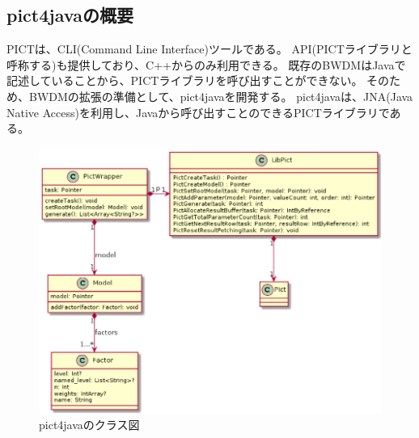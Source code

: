 \documentclass[uplatex, report, a4j, 10pt]{jsbook}
\newcommand\ttt[1]{\texttt{#1}}
\begin{document}
\subsection{pict4javaの概要}\label{sec:create_pict4java}
PICTは、CLI(Command Line Interface)ツールである。
API(PICTライブラリと呼称する)も提供しており、C++からのみ利用できる。
既存のBWDMはJavaで記述していることから、PICTライブラリを呼び出すことができない。
そのため、BWDMの拡張の準備として、pict4javaを開発する。
pict4javaは、JNA(Java Native Access)\cite{jna}を利用し、Javaから呼び出すことのできるPICTライブラリである。

\begin{figure}[tp]
  \centering
  \includegraphics[keepaspectratio, width=160mm]{figs/pict4java_class}
  \caption{pict4javaのクラス図}
  \label{fig:pict4javaClass}
\end{figure}

\newcommand{\PictAddParameter}{\ttt{PictAddParameter}}
\newcommand{\PictGenerate}{\ttt{PictGenerate}}
\newcommand{\PictGetNextResultRow}{\ttt{PictGetNextResultRow}}
\newcommand{\createTask}{\ttt{createTask}}
\newcommand{\setRootModel}{\ttt{setRootModel}}
\newcommand{\generate}{\ttt{generate}}
\newcommand{\addFactor}{\ttt{addFactor}}
\end{document}
